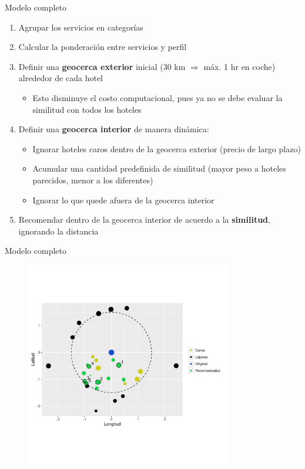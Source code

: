 \documentclass{beamer}
\begin{document}
\begin{frame}{Modelo completo}
	\begin{enumerate}%
		\item Agrupar los servicios en categorías
		\item Calcular la ponderación entre servicios y perfil
		\item Definir una \textbf{geocerca exterior} inicial (30 km $\Rightarrow$ máx. 1 hr en coche) alrededor de cada hotel
		\begin{itemize}
			\item Esto disminuye el costo computacional, pues ya no se debe evaluar la similitud con todos los hoteles
		\end{itemize}
		\item Definir una \textbf{geocerca interior} de manera dinámica:
		\begin{itemize}
			\item Ignorar hoteles caros dentro de la geocerca exterior (precio de largo plazo)
			\item Acumular una cantidad predefinida de similitud (mayor peso a hoteles parecidos, menor a los diferentes)
			\item Ignorar lo que quede afuera de la geocerca interior
		\end{itemize}
		\item Recomendar dentro de la geocerca interior de acuerdo a la \textbf{similitud}, ignorando la distancia
	\end{enumerate}
\end{frame}

\begin{frame}{Modelo completo}
	\begin{figure}
		\centering
		\includegraphics[width=0.8\textwidth, clip = true, trim = 0 0 0 0]{imagenes/similitud-completa.pdf}
	\end{figure}
\end{frame}
\end{document}

